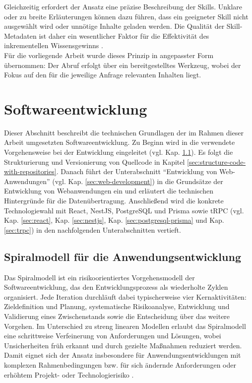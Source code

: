 Gleichzeitig erfordert der Ansatz eine präzise Beschreibung der Skills. Unklare oder zu breite Erläuterungen können dazu führen, dass ein geeigneter Skill nicht ausgewählt wird oder unnötige Inhalte geladen werden. 
Die Qualität der Skill-Metadaten ist daher ein wesentlicher Faktor für die Effektivität des inkrementellen Wissensgewinns \cite{agentskills_github}. \\

Für die vorliegende Arbeit wurde dieses Prinzip in angepasster Form übernommen: Der Abruf erfolgt über ein bereitgestelltes Werkzeug, wobei der Fokus auf den für die jeweilige Anfrage relevanten Inhalten liegt.

\section{Softwareentwicklung}
\label{sec:software-development}

Dieser Abschnitt beschreibt die technischen Grundlagen der im Rahmen dieser Arbeit umgesetzten Softwareentwicklung. 
Zu Beginn wird in die verwendete Vorgehensweise bei der Entwicklung eingeleitet (vgl. Kap. \ref{sec:spiral-model}).
Es folgt die Strukturierung und Versionierung von Quellcode in Kapitel \ref{sec:structure-code-with-repositories}.
Danach führt der Unterabschnitt \enquote{Entwicklung von Web-Anwendungen} (vgl. Kap. \ref{sec:web-development}) in die Grundsätze der Entwicklung von Webanwendungen ein und erläutert die technischen Hintergründe für die Datenübertragung.
Anschließend wird die konkrete Technologiewahl mit React, NestJS, PostgreSQL und Prisma sowie tRPC (vgl. Kap. \ref{sec:react}, Kap. \ref{sec:nestjs}, Kap. \ref{sec:postgresql-prisma} und Kap. \ref{sec:trpc}) in den nachfolgenden Unterabschnitten vertieft.

\subsection{Spiralmodell für die Anwendungsentwicklung}
\label{sec:spiral-model}

Das Spiralmodell ist ein risikoorientiertes Vorgehensmodell der Softwareentwicklung, das den Entwicklungsprozess als wiederholte Zyklen organisiert.
Jede Iteration durchläuft dabei typischerweise vier Kernaktivitäten: Zieldefinition und Planung, systematische Risikoanalyse, Entwicklung und Validierung eines Zwischenstands sowie die Entscheidung über das weitere Vorgehen.
Im Unterschied zu streng linearen Modellen erlaubt das Spiralmodell eine schrittweise Verfeinerung von Anforderungen und Lösungen, wobei Unsicherheiten früh erkannt und durch gezielte Maßnahmen reduziert werden.
Damit eignet sich der Ansatz insbesondere für Anwendungsentwicklungen mit komplexen Rahmenbedingungen bzw. für sich ändernde Anforderungen oder erhöhtem Projekt- oder Technologierisiko \cite{boehm1988spiralmodel}.

